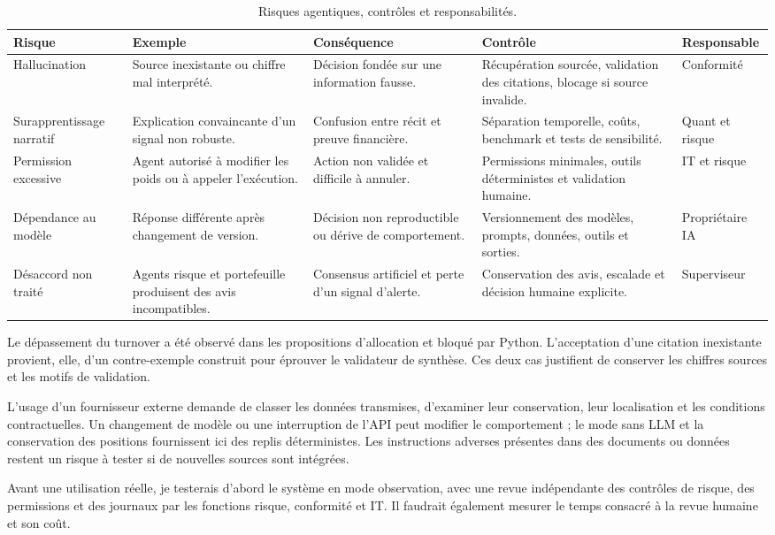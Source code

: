 \begin{table}[H]
\centering
\caption{Risques agentiques, contrôles et responsabilités.}
\label{tab:risques-agentiques}
\scriptsize
\begin{adjustbox}{width=\textwidth}
\begin{tabular}{p{}p{}p{}p{}p{}}
\toprule
\textbf{Risque} & \textbf{Exemple} & \textbf{Conséquence} & \textbf{Contrôle} & \textbf{Responsable} \\
\midrule
Hallucination & Source inexistante ou chiffre mal interprété. & Décision fondée sur une information fausse. & Récupération sourcée, validation des citations, blocage si source invalide. & Conformité \\
Surapprentissage narratif & Explication convaincante d'un signal non robuste. & Confusion entre récit et preuve financière. & Séparation temporelle, coûts, benchmark et tests de sensibilité. & Quant et risque \\
Permission excessive & Agent autorisé à modifier les poids ou à appeler l'exécution. & Action non validée et difficile à annuler. & Permissions minimales, outils déterministes et validation humaine. & IT et risque \\
Dépendance au modèle & Réponse différente après changement de version. & Décision non reproductible ou dérive de comportement. & Versionnement des modèles, prompts, données, outils et sorties. & Propriétaire IA \\
Désaccord non traité & Agents risque et portefeuille produisent des avis incompatibles. & Consensus artificiel et perte d'un signal d'alerte. & Conservation des avis, escalade et décision humaine explicite. & Superviseur \\
\bottomrule
\end{tabular}
\end{adjustbox}
\end{table}

Le dépassement du turnover a été observé dans les propositions d'allocation et bloqué par Python. L'acceptation d'une citation inexistante provient, elle, d'un contre-exemple construit pour éprouver le validateur de synthèse. Ces deux cas justifient de conserver les chiffres sources et les motifs de validation.

L'usage d'un fournisseur externe demande de classer les données transmises, d'examiner leur conservation, leur localisation et les conditions contractuelles. Un changement de modèle ou une interruption de l'API peut modifier le comportement ; le mode sans LLM et la conservation des positions fournissent ici des replis déterministes. Les instructions adverses présentes dans des documents ou données restent un risque à tester si de nouvelles sources sont intégrées.

Avant une utilisation réelle, je testerais d'abord le système en mode observation, avec une revue indépendante des contrôles de risque, des permissions et des journaux par les fonctions risque, conformité et IT. Il faudrait également mesurer le temps consacré à la revue humaine et son coût.
